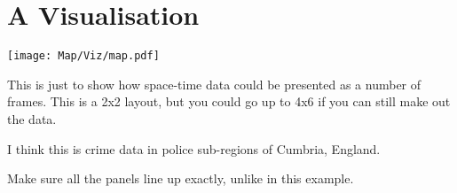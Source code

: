 

\section{A Visualisation}

\begin{marginfigure}
\texttt{[image: Map/Viz/map.pdf]}
\end{marginfigure}

This is just to show how space-time data could be presented
as a number of frames. This is a 2x2 layout, but you could
go up to 4x6 if you can still make out the data.

I think this is crime data in police sub-regions of Cumbria, England.

Make sure all the panels line up exactly, unlike in this example.

